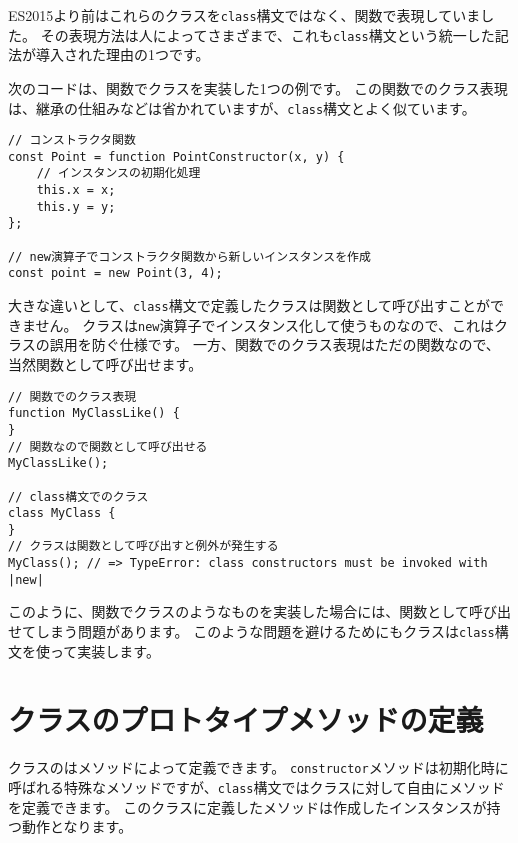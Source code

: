 \begin{tcolorbox}[enhanced jigsaw,breakable,title=\texttt{class}構文と関数でのクラスの違い]\label{class-vs-function}

ES2015より前はこれらのクラスを\texttt{class}構文ではなく、関数で表現していました。
その表現方法は人によってさまざまで、これも\texttt{class}構文という統一した記法が導入された理由の1つです。

次のコードは、関数でクラスを実装した1つの例です。
この関数でのクラス表現は、継承の仕組みなどは省かれていますが、\texttt{class}構文とよく似ています。

\begin{lstlisting}
// コンストラクタ関数
const Point = function PointConstructor(x, y) {
    // インスタンスの初期化処理
    this.x = x;
    this.y = y;
};

// new演算子でコンストラクタ関数から新しいインスタンスを作成
const point = new Point(3, 4);
\end{lstlisting}

大きな違いとして、\texttt{class}構文で定義したクラスは関数として呼び出すことができません。
クラスは\texttt{new}演算子でインスタンス化して使うものなので、これはクラスの誤用を防ぐ仕様です。
一方、関数でのクラス表現はただの関数なので、当然関数として呼び出せます。

\begin{lstlisting}
// 関数でのクラス表現
function MyClassLike() {
}
// 関数なので関数として呼び出せる
MyClassLike(); 

// class構文でのクラス
class MyClass {
}
// クラスは関数として呼び出すと例外が発生する
MyClass(); // => TypeError: class constructors must be invoked with |new|
\end{lstlisting}

このように、関数でクラスのようなものを実装した場合には、関数として呼び出せてしまう問題があります。
このような問題を避けるためにもクラスは\texttt{class}構文を使って実装します。
\end{tcolorbox}

\hypertarget{class-prototype-method-definition}{%
\section{クラスのプロトタイプメソッドの定義}\label{class-prototype-method-definition}}

クラスの\textbf{}はメソッドによって定義できます。
\texttt{constructor}メソッドは初期化時に呼ばれる特殊なメソッドですが、\texttt{class}構文ではクラスに対して自由にメソッドを定義できます。
このクラスに定義したメソッドは作成したインスタンスが持つ動作となります。

